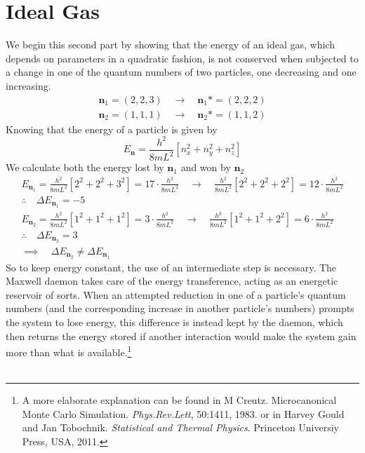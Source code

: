\documentclass[a4paper, 12pt, notitlepage]{article}
\begin{document}
\section*{Ideal Gas}
We begin this second part by showing that the energy of an ideal gas, which depends on parameters in a quadratic fashion, is not conserved when subjected to a change in one of the quantum numbers of two particles, one decreasing and one increasing.
\begin{align*}
	\mathbf{n}_1 = (2,2,3) \quad\rightarrow\quad \mathbf{n}_1* = (2,2,2)\\
	\mathbf{n}_2 = (1,1,1) \quad\rightarrow\quad \mathbf{n}_2* = (1,1,2)
\end{align*}
Knowing that the energy of a particle is given by
\begin{equation*}
	E_\mathbf{n} = \frac{h^2}{8mL^2}\left[n_x^2 + n_y^2 + n_z^2\right]
\end{equation*}
We calculate both the energy lost by $\mathbf{n}_1$ and won by $\mathbf{n}_2$
\begin{gather*}
	E_{\mathbf{n}_1} = \frac{h^2}{8mL^2}\left[2^2 + 2^2 + 3^2\right] = 17\cdot\frac{h^2}{8mL^2} \quad \rightarrow \quad \frac{h^2}{8mL^2}\left[2^2 + 2^2 + 2^2\right] = 12\cdot\frac{h^2}{8mL^2}\\[10pt]
	\therefore\quad \Delta E_{\mathbf{n}_1} = \boxed{-5}\\[10pt]
	E_{\mathbf{n}_2} = \frac{h^2}{8mL^2}\left[1^2 + 1^2 + 1^2\right] = 3\cdot\frac{h^2}{8mL^2} \quad \rightarrow \quad \frac{h^2}{8mL^2}\left[1^2 + 1^2 + 2^2\right] = 6\cdot\frac{h^2}{8mL^2}\\[10pt]
	\therefore\quad \Delta E_{\mathbf{n}_2} = \boxed{3}\\[10pt]
	\implies \quad \Delta E_{\mathbf{n}_2} \neq \Delta E_{\mathbf{n}_1}
\end{gather*}
So to keep energy constant, the use of an intermediate step is necessary. The Maxwell daemon takes care of the energy transference, acting as an energetic reservoir of sorts. When an attempted reduction in one of a particle's quantum numbers (and the corresponding increase in another particle's numbers) prompts the system to lose energy, this difference is instead kept by the daemon, which then returns the energy stored if another interaction would make the system gain more than what is available.\footnote{A more elaborate explanation can be found in M Creutz. Microcanonical Monte Carlo Simulation. \textit{Phys.Rev.Lett}, 50:1411, 1983. or in Harvey Gould and Jan Tobochnik. \textit{Statistical and Thermal Physics}. Princeton Universiy Press, USA, 2011.}\\\\
\end{document}
